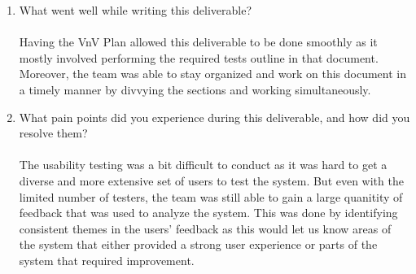\documentclass[12pt, titlepage]{article}
\begin{document}
\begin{enumerate}
  \item What went well while writing this deliverable?\\\\
  Having the VnV Plan allowed this deliverable to be done smoothly as it mostly involved performing the required
  tests outline in that document. Moreover, the team was able to stay organized and work on this document 
  in a timely manner by divvying the sections and working simultaneously.\\
  \item What pain points did you experience during this deliverable, and how
  did you resolve them?\\\\
  The usability testing was a bit difficult to conduct as it was hard to get a diverse and more extensive
  set of users to test the system. But even with the limited number of testers, the team was still able to gain
  a large quanitity of feedback that was used to analyze the system. This was done by identifying consistent
  themes in the users' feedback as this would let us know areas of the system that either provided a strong user
  experience or parts of the system that required improvement. 
\end{enumerate}
\end{document}
